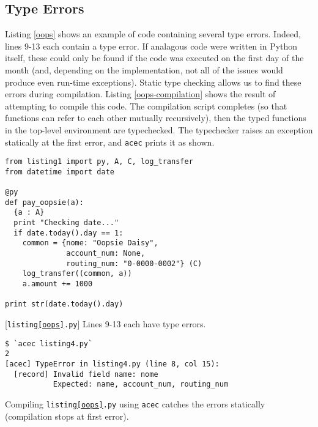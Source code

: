 \documentclass[10pt,preprint]{sigplanconf}
\begin{document}
{%

\subsection{Type Errors}
Listing \ref{oops} shows an example of code containing several type errors. Indeed, lines 9-13 each contain a type error. If analagous code were written in Python itself, these could only be found if the code was executed on the first day of the month (and, depending on the implementation, not all of the issues would  produce even run-time exceptions). Static type checking allows us to find these errors during compilation. Listing \ref{oops-compilation} shows the result of attempting to compile this code. The compilation script completes (so that functions can refer to each other mutually recursively), then the typed functions in the top-level environment are typechecked. The typechecker raises an exception statically at the first error, and \verb|acec| prints it as shown.
\begin{codelisting}[t]
\begin{lstlisting}
from listing1 import py, A, C, log_transfer
from datetime import date

@py
def pay_oopsie(a):
  {a : A}
  print "Checking date..."
  if date.today().day == 1:
    common = {nome: "Oopsie Daisy",
              account_num: None,
              routing_num: "0-0000-0002"} (C)
    log_transfer((common, a))
    a.amount += 1000
    
print str(date.today().day)
\end{lstlisting}
\caption{[\texttt{listing\ref{oops}.py}] Lines 9-13 each have type errors.}
\label{oops}
\end{codelisting}
\begin{codelisting}
\begin{lstlisting}[style=Bash]
$ `acec listing4.py`
2
[acec] TypeError in listing4.py (line 8, col 15): 
  [record] Invalid field name: nome
           Expected: name, account_num, routing_num
\end{lstlisting}
\caption{Compiling \texttt{listing\ref{oops}.py} using \texttt{acec} catches the errors statically (compilation stops at first error).}
\label{oops-compilation}
\end{codelisting}



}
\end{document}
